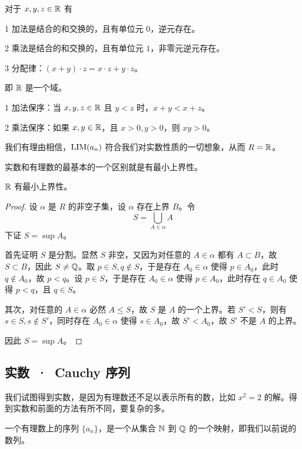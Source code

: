 \begin{theorem}[$\RR$ 的代数算律]
	对于 $x,y,z\in \mathbb{R}$ 有

	\num{1} 加法是结合的和交换的，且有单位元 $0$，逆元存在。

	\num{2} 乘法是结合的和交换的，且有单位元 $1$，非零元逆元存在。

	\num{3} 分配律：$(x+y) \cdot  z = x \cdot z + y\cdot z$。
\end{theorem}

即 $\RR$ 是一个域。

\begin{theorem}[$\RR$ 是有序域]
	\num{1} 加法保序：当 $x,y,z\in \mathbb{R}$ 且 $y<z$ 时，$x+y<x+z$。

	\num{2} 乘法保序：如果 $x,y\in \mathbb{R}$，且 $x>0,y>0$，则 $xy>0$。
\end{theorem}

我们有理由相信，$\operatorname{{LIM}}(a_n)$ 符合我们对实数性质的一切想象，从而 $R = \mathbb{R}$。

实数和有理数的最基本的一个区别就是有最小上界性。

\begin{theorem}
	$\RR$ 有最小上界性。
\end{theorem}
\begin{proof}
	设 $\alpha$ 是 $R$ 的非空子集，设 $\alpha$ 存在上界 $B$。令
	$$S = \bigcup_{A \in \alpha} A$$
	下证 $S = \sup A$。

	首先证明 $S$ 是分割。显然 $S$ 非空，又因为对任意的 $A\in \alpha$ 都有 $A \subset B$，故 $S \subset B$，因此 $S \ne \mathbb{Q}$。取 $p \in S,q\notin S$，于是存在 $A_0 \in \alpha$ 使得 $p \in A_0$，此时 $q \notin A_0$，故 $p<q$。设 $p \in S$，于是存在 $A_0 \in \alpha$ 使得 $p \in A_0$，此时存在 $q\in A_0$ 使得 $p < q$，且 $q \in S$。

	其次，对任意的 $A \in \alpha$ 必然 $A \leqslant S$，故 $S$ 是 $A$ 的一个上界。若 $S' < S$，则有 $s \in S, s \notin S'$，同时存在 $A_0 \in \alpha$ 使得 $s \in A_0$，故 $S' < A_0$，故 $S'$ 不是 $A$ 的上界。

	因此 $S = \sup A$。
\end{proof}

\subsection{实数\ ·\ Cauchy 序列}

我们试图得到实数，是因为有理数还不足以表示所有的数，比如 $x^2=2$ 的解。得到实数和前面的方法有所不同，要复杂的多。

一个有理数上的序列 $\{a_n\}$，是一个从集合 $\mathbb{N}$ 到 $\mathbb{Q}$ 的一个映射，即我们以前说的数列。

